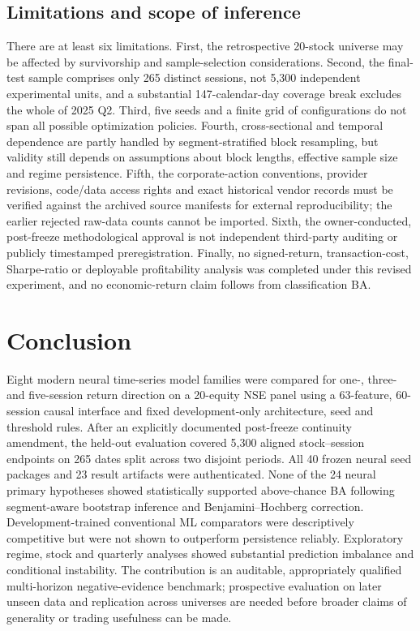 \documentclass[fleqn,10pt]{wlscirep}
\begin{document}
\subsection{Limitations and scope of inference}\label{sec:limitations}
There are at least six limitations. First, the retrospective 20-stock universe may be affected by survivorship and sample-selection considerations. Second, the final-test sample comprises only 265 distinct sessions, not 5,300 independent experimental units, and a substantial 147-calendar-day coverage break excludes the whole of 2025 Q2. Third, five seeds and a finite grid of configurations do not span all possible optimization policies. Fourth, cross-sectional and temporal dependence are partly handled by segment-stratified block resampling, but validity still depends on assumptions about block lengths, effective sample size and regime persistence. Fifth, the corporate-action conventions, provider revisions, code/data access rights and exact historical vendor records must be verified against the archived source manifests for external reproducibility; the earlier rejected raw-data counts cannot be imported. Sixth, the owner-conducted, post-freeze methodological approval is not independent third-party auditing or publicly timestamped preregistration. Finally, no signed-return, transaction-cost, Sharpe-ratio or deployable profitability analysis was completed under this revised experiment, and no economic-return claim follows from classification BA.

\section{Conclusion}\label{sec:conclusion}
Eight modern neural time-series model families were compared for one-, three- and five-session return direction on a 20-equity NSE panel using a 63-feature, 60-session causal interface and fixed development-only architecture, seed and threshold rules. After an explicitly documented post-freeze continuity amendment, the held-out evaluation covered 5,300 aligned stock--session endpoints on 265 dates split across two disjoint periods. All 40 frozen neural seed packages and 23 result artifacts were authenticated. None of the 24 neural primary hypotheses showed statistically supported above-chance BA following segment-aware bootstrap inference and Benjamini--Hochberg correction. Development-trained conventional ML comparators were descriptively competitive but were not shown to outperform persistence reliably. Exploratory regime, stock and quarterly analyses showed substantial prediction imbalance and conditional instability. The contribution is an auditable, appropriately qualified multi-horizon negative-evidence benchmark; prospective evaluation on later unseen data and replication across universes are needed before broader claims of generality or trading usefulness can be made.
\end{document}
